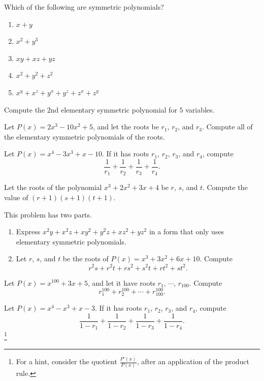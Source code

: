 \documentclass[11pt]{scrartcl}
\begin{document}
\begin{problem}[1]{}
Which of the following are symmetric polynomials?
\begin{enumerate}
\item $x+y$
\item $x^2+y^3$
\item $xy+xz+yz$
\item $x^2+y^2+z^2$
\item $x^y+x^z+y^x+y^z+z^x+z^y$
\end{enumerate}
\end{problem}
\begin{problem}[2]{}
Compute the $2$nd elementary symmetric polynomial for $5$ variables.
\end{problem}
\begin{problem}[3]{}
Let $P(x) = 2x^3-10x^2+5$, and let the roots be $r_1$, $r_2$, and $r_3$. Compute all of the elementary symmetric polynomials of the roots.
\end{problem}
\begin{problem}[4]{}
Let $P(x) = x^4-3x^3+x-10$. If it has roots $r_1$, $r_2$, $r_3$, and $r_4$, compute \[\dfrac{1}{r_1}+\dfrac{1}{r_2}+\dfrac{1}{r_3}+\dfrac{1}{r_4}.\]
\end{problem}
\begin{problem}[5]{}
Let the roots of the polynomial $x^3+2x^2+3x+4$ be $r$, $s$, and $t$. Compute the value of $(r+1)(s+1)(t+1)$.
\end{problem}
\begin{problem}[6]{}
This problem has two parts.
\begin{enumerate}
\item Express $x^2y+x^2z+xy^2+y^2z+xz^2+yz^2$ in a form that only uses elementary symmetric polynomials.
\item Let $r$, $s$, and $t$ be the roots of $P(x) = x^3+3x^2+6x+10$. Compute \[r^2s+r^2t+rs^2+s^2t+rt^2+st^2.\]
\end{enumerate}
\end{problem}
\begin{problem}[7]{}
\item Let $P(x) = x^{100}+3x+5$, and let it have roots $r_1$, $\cdots$, $r_{100}$. Compute \[r_1^{100}+r_2^{100}+\cdots+r_{100}^{100}.\]
\end{problem}
\begin{problem}[8]{}
Let $P(x) = x^4-x^3+x-3$. If it has roots $r_1$, $r_2$, $r_3$, and $r_4$, compute \[\dfrac{1}{1-r_1}+\dfrac{1}{1-r_2}+\dfrac{1}{1-r_3}+\dfrac{1}{1-r_4}.\]\footnote{For a hint, consider the quotient $\tfrac{P'(x)}{P(x)}$, after an application of the product rule.}
\end{problem}
\end{document}
